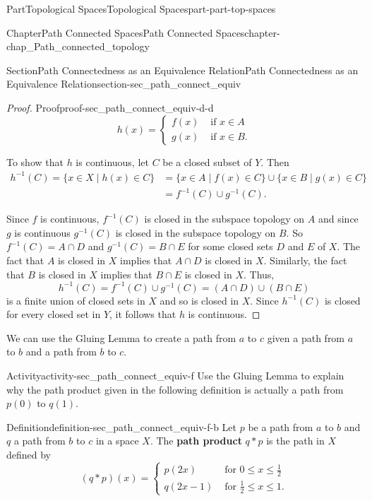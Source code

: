 \documentclass[oneside,10pt,]{book}
\newcommand{\terminology}[1]{\textbf{#1}}
\numberwithin{equation}{chapter}
\newcommand{\amp}{&}
\begin{document}
\begin{partptx}{Part}{Topological Spaces}{}{Topological Spaces}{}{}{part-part-top-spaces}
\begin{chapterptx}{Chapter}{Path Connected Spaces}{}{Path Connected Spaces}{}{}{chapter-chap_Path_connected_topology}
\begin{sectionptx}{Section}{Path Connectedness as an Equivalence Relation}{}{Path Connectedness as an Equivalence Relation}{}{}{section-sec_path_connect_equiv}
\begin{proof}{Proof}{}{proof-sec_path_connect_equiv-d-d}
\begin{equation*}
h(x) = \begin{cases}f(x) \amp \text{ if }  x \in A \\ g(x) \amp \text{ if }  x \in B. \end{cases}
\end{equation*}
%
\par
To show that \(h\) is continuous, let \(C\) be a closed subset of \(Y\). Then%
\begin{align*}
h^{-1}(C) = \{x \in X \mid h(x) \in C\} \amp = \{x \in A \mid f(x) \in C\} \cup \{x \in B \mid g(x) \in C\}\\
\amp = f^{-1}(C) \cup g^{-1}(C)\text{.}
\end{align*}
%
\par
Since \(f\) is continuous, \(f^{-1}(C)\) is closed in the subspace topology on \(A\) and since \(g\) is continuous \(g^{-1}(C)\) is closed in the subspace topology on \(B\). So \(f^{-1}(C) = A \cap D\) and \(g^{-1}(C) = B \cap E\) for some closed sets \(D\) and \(E\) of \(X\). The fact that \(A\) is closed in \(X\) implies that \(A \cap D\) is closed in \(X\). Similarly, the fact that \(B\) is closed in \(X\) implies that \(B \cap E\) is closed in \(X\). Thus,%
\begin{equation*}
h^{-1}(C) = f^{-1}(C) \cup g^{-1}(C) = (A \cap D) \cup (B \cap E)
\end{equation*}
is a finite union of closed sets in \(X\) and so is closed in \(X\). Since \(h^{-1}(C)\) is closed for every closed set in \(Y\), it follows that \(h\) is continuous.%
\end{proof}
We can use the Gluing Lemma to create a path from \(a\) to \(c\) given a path from \(a\) to \(b\) and a path from \(b\) to \(c\).%
\begin{activity}{Activity}{}{activity-sec_path_connect_equiv-f}%
Use the Gluing Lemma to explain why the path product given in the following definition is actually a path from \(p(0)\) to \(q(1)\).%
\begin{definition}{Definition}{}{definition-sec_path_connect_equiv-f-b}%
%
Let \(p\) be a path from \(a\) to \(b\) and \(q\) a path from \(b\) to \(c\) in a space \(X\). The \terminology{path product} \(q*p\) is the path in \(X\) defined by%
\begin{equation*}
(q*p)(x) = \begin{cases}p(2x) \amp \text{ for }  0 \leq x \leq \frac{1}{2} \\ q(2x-1) \amp \text{ for }  \frac{1}{2} \leq x \leq 1. \end{cases}

\end{equation*}
\end{definition}
\end{activity}
\end{sectionptx}
\end{chapterptx}
\end{partptx}
\end{document}
